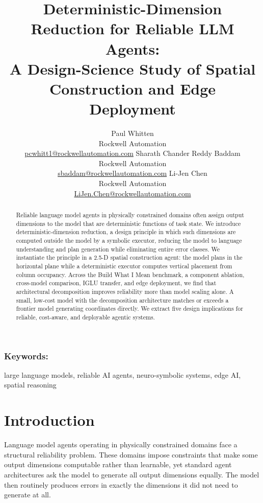 \documentclass[10pt]{article}
\title{Deterministic-Dimension Reduction for Reliable LLM Agents:\\
A Design-Science Study of Spatial Construction and Edge Deployment}
\author{
Paul Whitten \\
Rockwell Automation \\
{\underline{pcwhitt1@rockwellautomation.com}}
\And
Sharath Chander Reddy Baddam \\
Rockwell Automation \\
{\underline{sbaddam@rockwellautomation.com}}
\And
Li-Jen Chen \\
Rockwell Automation \\
{\underline{LiJen.Chen@rockwellautomation.com}}
}
\date{}
\begin{document}
\maketitle

\begin{abstract}
Reliable language model agents in physically constrained domains often
assign output dimensions to the model that are deterministic functions of
task state. We introduce deterministic-dimension reduction, a design
principle in which such dimensions are computed outside the model by a
symbolic executor, reducing the model to language understanding and plan
generation while eliminating entire error classes. We instantiate the
principle in a 2.5-D spatial construction agent: the model plans in the
horizontal plane while a deterministic executor computes vertical placement
from column occupancy. Across the Build What I Mean benchmark, a component
ablation, cross-model comparison, IGLU transfer, and edge deployment, we
find that architectural decomposition improves
reliability more than model scaling alone. A small, low-cost model with the
decomposition architecture matches or exceeds a frontier model generating
coordinates directly. We extract five design implications for reliable,
cost-aware, and deployable agentic systems.
\end{abstract}

\subsubsection*{Keywords:}

large language models, reliable AI agents, neuro-symbolic systems,
edge AI, spatial reasoning

\section{Introduction}

Language model agents operating in physically constrained domains face a
structural reliability problem. These domains impose constraints that make
some output dimensions computable rather than learnable, yet standard agent
architectures ask the model to generate all output dimensions equally. The
model then routinely produces errors in exactly the dimensions it did not
need to generate at all.
\end{document}
